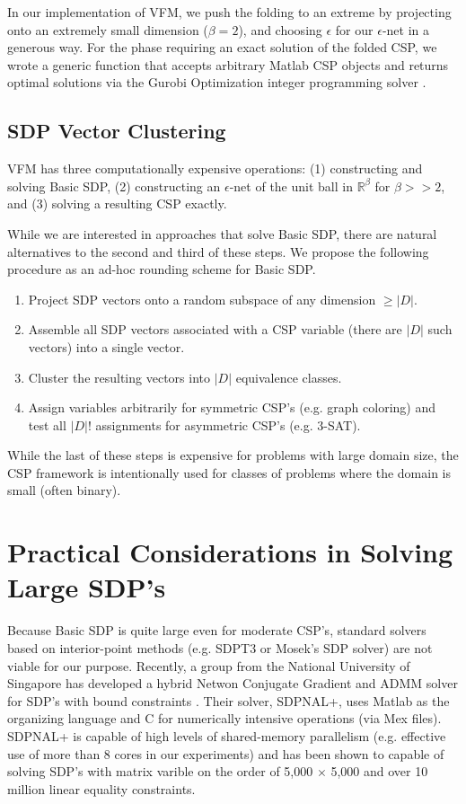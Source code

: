 \documentclass[12pt]{article} %
\begin{document}
In our implementation of VFM, we push the folding to an extreme by projecting onto an extremely small dimension ($\beta = 2$), and choosing $\epsilon$ for our $\epsilon$-net in a generous way. For the phase requiring an exact solution of the folded CSP, we wrote a generic function that accepts arbitrary Matlab CSP objects and returns optimal solutions via the Gurobi Optimization integer programming solver \cite{gurobi}.

\subsection{SDP Vector Clustering}

VFM has three computationally expensive operations: (1) constructing and solving Basic SDP, (2) constructing an $\epsilon$-net of the unit ball in $\mathbb{R}^\beta$ for $\beta>>2$, and (3) solving a resulting CSP exactly.

While we are interested in approaches that solve Basic SDP, there are natural alternatives to the second and third of these steps. We propose the following procedure as an ad-hoc rounding scheme for Basic SDP.
\begin{enumerate}
\item Project SDP vectors onto a random subspace of any dimension $\geq |D|$.
\item Assemble all SDP vectors associated with a CSP variable (there are $|D|$ such vectors) into a single vector.
\item Cluster the resulting vectors into $|D|$ equivalence classes.
\item Assign variables arbitrarily for symmetric CSP's (e.g. graph coloring) and test all $|D|!$ assignments for asymmetric CSP's (e.g. 3-SAT).
\end{enumerate}

While the last of these steps is expensive for problems with large domain size, the CSP framework is intentionally used for classes of problems where the domain is small (often binary).

\section{Practical Considerations in Solving Large SDP's}

Because Basic SDP is quite large even for moderate CSP's, standard solvers based on interior-point methods (e.g. SDPT3 or Mosek's SDP solver) are not viable for our purpose. Recently, a group from the National University of Singapore has developed a hybrid Netwon Conjugate Gradient and ADMM solver for SDP's with bound constraints \cite{yang2015sdpnal+, zhao2010newton}. Their solver, SDPNAL+, uses Matlab as the organizing language and C for numerically intensive operations (via Mex files). SDPNAL+ is capable of high levels of shared-memory parallelism (e.g. effective use of more than 8 cores in our experiments) and has been shown to capable of solving SDP's with matrix varible on the order of 5,000 $\times$ 5,000 and over 10 million linear equality constraints.
\end{document}
